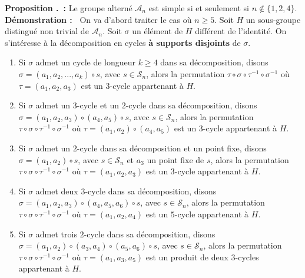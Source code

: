 \documentclass[5pt,a4paper]{article}
\newcounter{prop}[section]
\renewcommand{\theprop}{\thesection.\arabic{prop}}
\newcommand{\prop}[1]{\stepcounter{prop}\noindent\textbf{Proposition \theprop ~:} #1 \newline}
\newcommand{\demo}[1]{\textbf{Démonstration :~} #1 \newline}
\begin{document}
\begin{onehalfspacing}
\prop{Le groupe alterné $\mathcal{A}_n$ est simple si et seulement si $n \notin \{1, 2, 4\}$.}
\demo{On va d'abord traiter le cas où $n \geq 5$. Soit $H$ un sous-groupe distingué non trivial  de $\mathcal{A}_n$. Soit $\sigma$ un élément de $H$ différent de l'identité. On s'intéresse à la décomposition en cycles \textbf{à supports disjoints} de $\sigma$. 
	\begin{enumerate}
	\item Si $\sigma$ admet un cycle de longueur $k \geq 4$ dans sa décomposition, disons $\sigma = (a_1, a_2, ..., a_k) \circ s$, avec $s \in \mathcal{S}_n$, alors la permutation $\tau \circ \sigma \circ \tau^{-1} \circ \sigma ^{-1}$ où $\tau = (a_1, a_2, a_3)$ est un $3$-cycle appartenant à $H$.
	\item Si $\sigma$ admet un $3$-cycle et un $2$-cycle dans sa décomposition, disons $\sigma = (a_1, a_2, a_3) \circ (a_4, a_5) \circ s$, avec $s \in \mathcal{S}_n$, alors la permutation $\tau \circ \sigma \circ \tau^{-1} \circ \sigma ^{-1}$ où $\tau = (a_1, a_2) \circ (a_4, a_5)$ est un $3$-cycle appartenant à $H$.
	\item Si $\sigma$ admet un $2$-cycle dans sa décomposition et un point fixe, disons $\sigma = (a_1, a_2) \circ s$, avec $s \in \mathcal{S}_n$ et $a_3$ un point fixe de $s$, alors la permutation $\tau \circ \sigma \circ \tau^{-1} \circ \sigma ^{-1}$ où $\tau = (a_1, a_2, a_3)$ est un $3$-cycle appartenant à $H$.
	\item Si $\sigma$ admet deux $3$-cycle dans sa décomposition, disons $\sigma = (a_1, a_2, a_3) \circ (a_4, a_5, a_6) \circ s$, avec $s \in \mathcal{S}_n$, alors la permutation $\tau \circ \sigma \circ \tau^{-1} \circ \sigma ^{-1}$ où $\tau = (a_1, a_2, a_4)$ est un $5$-cycle appartenant à $H$.
	\item Si $\sigma$ admet trois $2$-cycle dans sa décomposition, disons $\sigma = (a_1, a_2) \circ (a_3, a_4) \circ (a_5, a_6) \circ s$, avec $s \in \mathcal{S}_n$, alors la permutation $\tau \circ \sigma \circ \tau^{-1} \circ \sigma ^{-1}$ où $\tau = (a_1, a_3, a_5)$ est un produit de deux $3$-cycles appartenant à $H$.
	\end{enumerate}
}
\end{onehalfspacing}
\end{document}

